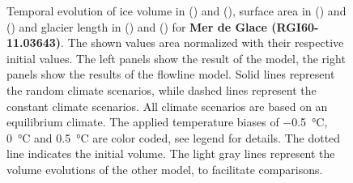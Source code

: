 \begin{figure}[p]
  \caption{Temporal evolution of ice volume in () and (), surface area in () and () and glacier length in () and () for \textbf{Mer de Glace (RGI60-11.03643)}. The shown values area normalized with their respective initial values. The left panels show the result of the \vas{} model, the right panels show the results of the flowline model. Solid lines represent the random climate scenarios, while dashed lines represent the constant climate scenarios. All climate scenarios are based on an equilibrium climate. The applied temperature biases of \SI{-.5}{\celsius}, \SI{0}{\celsius} and \SI{+.5}{\celsius} are color coded, see legend for details. The dotted line indicates the initial volume. The light gray lines represent the volume evolutions of the other model, to facilitate comparisons.}
  \label{fig:Mer_de_Glace}
\end{figure}

